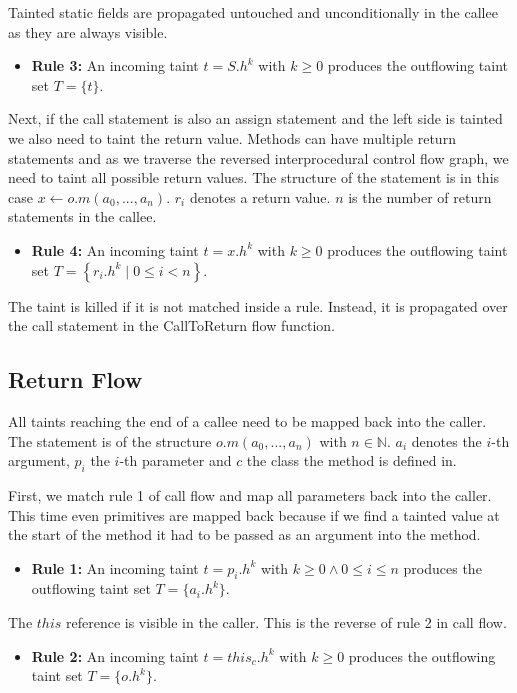 \documentclass[../draft.tex]{subfiles}
\begin{document}
    Tainted static fields are propagated untouched and unconditionally in the callee as they are always visible.
    \begin{itemize}
        \item[] \textbf{Rule 3:} An incoming taint $t = S.h^k$ with $k \geq 0$ produces the outflowing taint set $T = \{t\}$. 
    \end{itemize}

    Next, if the call statement is also an assign statement and the left side is tainted we also need to taint the return value. Methods can have multiple return statements and as we traverse the reversed interprocedural control flow graph, we need to taint all possible return values. The structure of the statement is in this case $x \leftarrow o.m(a_0,...,a_n)$. $r_i$ denotes a return value. $n$ is the number of return statements in the callee. 
    \begin{itemize}
        \item[] \textbf{Rule 4:} An incoming taint $t = x.h^k$ with $k \geq 0$ produces the outflowing taint set $T = \left\{r_i.h^k \mid 0 \leq i < n \right\}$. 
    \end{itemize}

    The taint is killed if it is not matched inside a rule. Instead, it is propagated over the call statement in the CallToReturn flow function.
    \subsection{Return Flow}
    All taints reaching the end of a callee need to be mapped back into the caller. The statement is of the structure $o.m(a_0, ..., a_n)$ with $n \in \mathbb{N}$. $a_i$ denotes the $i$-th argument, $p_i$ the $i$-th parameter and $c$ the class the method is defined in.

    First, we match rule 1 of call flow and map all parameters back into the caller. This time even primitives are mapped back because if we find a tainted value at the start of the method it had to be passed as an argument into the method.
    \begin{itemize}
        \item[] \textbf{Rule 1:} An incoming taint $t = p_i.h^k$ with $k \geq 0 \land 0 \leq i \leq n$ produces the outflowing taint set $T = \{a_i.h^k\}$.
    \end{itemize}

    The $\mathit{this}$ reference is visible in the caller. This is the reverse of rule 2 in call flow.
    \begin{itemize}
        \item[] \textbf{Rule 2:} An incoming taint $t = \mathit{this}_c.h^k$ with $k \geq 0$ produces the outflowing taint set $T = \{o.h^k\}$. 
    \end{itemize}
    
\end{document}
